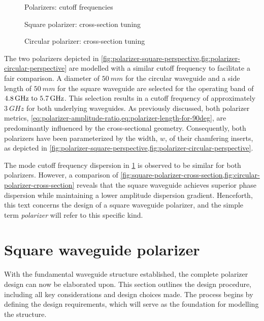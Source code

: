 \documentclass[14pt,a4paper]{ntust_report}
\begin{document}
\begin{figure}[!htbp]
    \centering
    
    \caption{\label{fig:polarizers-cutoff-frequencies}Polarizers: cutoff frequencies}
\end{figure}

\begin{figure}[!htbp]
    \centering
    
    \caption{\label{fig:square-polarizer-cross-section}Square polarizer: cross-section tuning}
\end{figure}

\begin{figure}[!htbp]
    \centering
    
    \caption{\label{fig:circular-polarizer-cross-section}Circular polarizer: cross-section tuning}
\end{figure}

The two polarizers depicted in \cref{fig:polarizer-square-perspective,fig:polarizer-circular-perspective} are modelled with a similar cutoff frequency to facilitate a fair comparison. A diameter of $\qty{50}{mm}$ for the circular waveguide and a side length of $\qty{50}{mm}$ for the square waveguide are selected for the operating band of $\frequencyrange$. This selection results in a cutoff frequency of approximately $\qty{3}{GHz}$ for both underlying waveguides. As previously discussed, both polarizer metrics, \cref{eq:polarizer-amplitude-ratio,eq:polarizer-length-for-90deg}, are predominantly influenced by the cross-sectional geometry. Consequently, both polarizers have been parameterized by the width, $w$, of their chamfering inserts, as depicted in \cref{fig:polarizer-square-perspective,fig:polarizer-circular-perspective}.

The mode cutoff frequency dispersion in \cref{fig:polarizers-cutoff-frequencies} is observed to be similar for both polarizers. However, a comparison of \cref{fig:square-polarizer-cross-section,fig:circular-polarizer-cross-section} reveals that the square waveguide achieves superior phase dispersion while maintaining a lower amplitude dispersion gradient. Henceforth, this text concerns the design of a square waveguide polarizer, and the simple term \emph{polarizer} will refer to this specific kind.

\section{Square waveguide polarizer}
With the fundamental waveguide structure established, the complete polarizer design can now be elaborated upon. This section outlines the design procedure, including all key considerations and design choices made. The process begins by defining the design requirements, which will serve as the foundation for modelling the structure.
\end{document}
